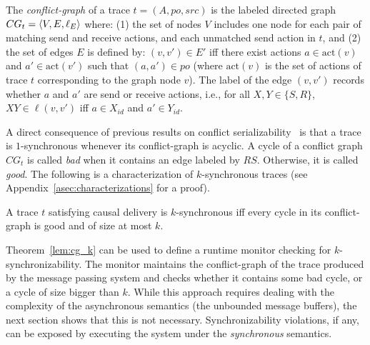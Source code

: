 
    The \emph{conflict-graph} of a trace $t=(A,po,src)$ is the labeled directed graph $CG_t=\left\langle {V,E,\ell_E} \right\rangle$ where:
(1) the set of nodes $V$ includes one node for each pair of matching send and receive actions, and each unmatched send action in $t$, and 
(2) the set of edges $E$ is defined by: $(v,v') \in E'$ iff there exist actions $a \in \mathrm{act}(v)$ and $a' \in \mathrm{act}(v')$ such that $(a,a') \in po$ (where $\mathrm{act}(v)$ is the set of actions of trace $t$ corresponding to the graph node $v$). The label of the edge $(v,v')$ records whether $a$ and $a'$ are send or receive actions, i.e., for all $X,Y\in \{S,R\}$, $XY\in \ell(v,v')$ iff $a\in X_{id}$ and $a'\in Y_{id}$.

A direct consequence of previous results on conflict serializability~\cite{journals/jacm/Papadimitriou79b} is that 
a trace is $1$-synchronous whenever its conflict-graph is acyclic.
%
%
A cycle of a conflict graph $CG_t$ is called \emph{bad} when it contains %
an edge labeled by $RS$.
Otherwise, it is called \emph{good}.
The following is a characterization of $k$-synchronous traces (see Appendix~\ref{asec:characterizations} for a proof).


\begin{theorem}\label{lem:cg_k}
A trace $t$ satisfying causal delivery is $k$-synchronous if{f} every cycle in its conflict-graph is good and of size at most $k$.
\end{theorem}

Theorem~\ref{lem:cg_k} can be used to define a runtime monitor checking for $k$-synchronizability. 
The monitor maintains the conflict-graph of the trace produced by the message passing system and checks whether it contains some bad cycle, or a cycle of size bigger than $k$.
While this approach requires dealing with the complexity of the asynchronous semantics (the unbounded message buffers), the next section shows that this is not necessary. Synchronizability violations, if any, can be exposed by executing the system under the \emph{synchronous} semantics.




